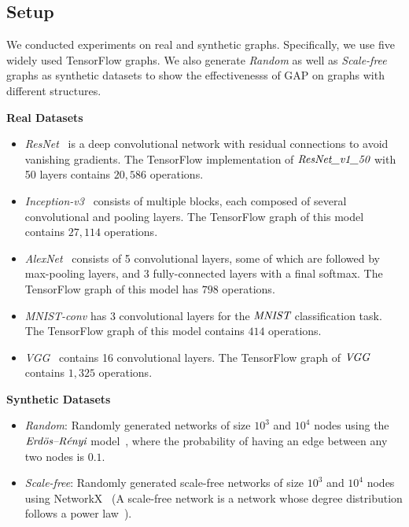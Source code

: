 \documentclass[10pt,twocolumn]{article}
\begin{document}
\subsection{Setup}
\label{sec:setup}
We conducted experiments on real and synthetic graphs. Specifically, we use five widely used TensorFlow graphs. We also generate \textit{Random} as well as \textit{Scale-free} graphs as synthetic datasets to show the effectivenesss of GAP on graphs with different structures.

\noindent\textbf{Real Datasets}
\begin{itemize}[leftmargin=*]
\item{ \textit{ResNet}~\cite{resnet_2016} is a deep convolutional network with residual connections to avoid vanishing gradients. The TensorFlow implementation of $\emph{ResNet\_v1\_50}$ with 50 layers contains $20,586$ operations.}
\item{\textit{Inception-v3}~\cite{inception_2017} consists of multiple blocks, each composed of several convolutional and pooling layers. The TensorFlow graph of this model contains $27,114$ operations.}
\end{itemize}
\begin{itemize}[leftmargin=*]
\item{\textit{AlexNet}~\cite{alexnet_2012} consists of 5 convolutional layers, some of which are followed by max-pooling layers, and 3 fully-connected layers with a final softmax. The TensorFlow graph of this model has $798$ operations.}
\item \textit{MNIST-conv} has 3 convolutional layers for the $\emph{MNIST}$ classification task. The TensorFlow graph of this model contains $414$ operations.
\item{\textit{VGG}~\cite{vgg_2014} contains 16 convolutional layers. The TensorFlow graph of $\emph{VGG}$ contains $1,325$ operations.}
\end{itemize}

\noindent\textbf{Synthetic Datasets} 
\begin{itemize}[leftmargin=*]
\item{ \textit{Random}: Randomly generated networks of size $10^3$ and $10^4$ nodes using the $\emph{Erd{\"o}s--R{\'e}nyi}$ model~\cite{erdos_1960}, where the probability of having an edge between any two nodes is $0.1$.}
\item{ \textit{Scale-free}: Randomly generated scale-free networks of size $10^3$ and $10^4$ nodes using NetworkX~\cite{hagberg2008} (A scale-free network is a network whose degree distribution follows a power law~\cite{Bollobas2003}).}
\end{itemize}
\end{document}
